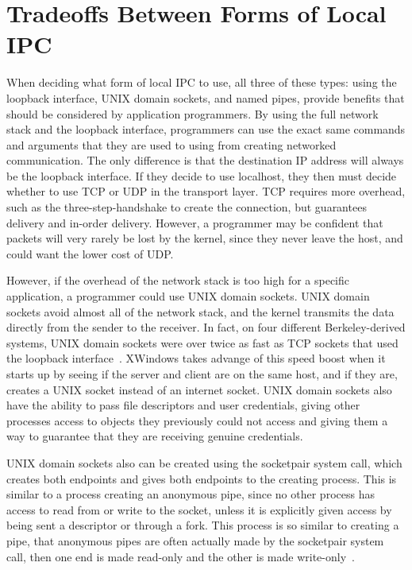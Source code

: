 \section{Tradeoffs Between Forms of Local IPC}
\label{sec:localIPCTradeoffs}
When deciding what form of local IPC to use, all three of these types: using the loopback interface, UNIX domain sockets, and named pipes, provide benefits that should be considered by application programmers.  By using the full network stack and the loopback interface, programmers can use the exact same commands and arguments that they are used to using from creating networked communication.  The only difference is that the destination IP address will always be the loopback interface.  If they decide to use localhost, they then must decide whether to use TCP or UDP in the transport layer.  TCP requires more overhead, such as the three-step-handshake to create the connection, but guarantees delivery and in-order delivery.  However, a programmer may be confident that packets will very rarely be lost by the kernel, since they never leave the host, and could want the lower cost of UDP.

However, if the overhead of the network stack is too high for a specific application, a programmer could use UNIX domain sockets.  UNIX domain sockets avoid almost all of the network stack, and the kernel transmits the data directly from the sender to the receiver.  In fact, on four different Berkeley-derived systems, UNIX domain sockets were over twice as fast as TCP sockets that used the loopback interface~\cite[223--224]{Stevens:1997:UNP:522800}.  XWindows takes advange of this speed boost when it starts up by seeing if the server and client are on the same host, and if they are, creates a UNIX socket instead of an internet socket.  UNIX domain sockets also have the ability to pass file descriptors and user credentials, giving other processes access to objects they previously could not access and giving them a way to guarantee that they are receiving genuine credentials.

UNIX domain sockets also can be created using the socketpair system call, which creates both endpoints and gives both endpoints to the creating process.  This is similar to a process creating an anonymous pipe, since no other process has access to read from or write to the socket, unless it is explicitly given access by being sent a descriptor or through a fork.  This process is so similar to creating a pipe, that anonymous pipes are often actually made by the socketpair system call, then one end is made read-only and the other is made write-only~\cite[253]{Stevens:1996:TIT:233130}.

